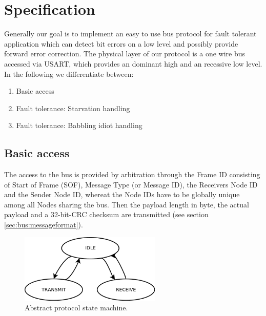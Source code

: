 \section{Specification}
\label{sec:bus:specification}
Generally our goal is to implement an easy to use bus protocol for fault tolerant application which can 
detect bit errors on a low level and possibly provide forward error correction.
The physical layer of our protocol is a one wire bus accessed via USART, which provides an dominant 
high and an recessive low level.
In the following we differentiate between: 
\begin{enumerate}
 \item Basic access
 \item Fault tolerance: Starvation handling
 \item Fault tolerance: Babbling idiot handling
\end{enumerate}

\subsection{Basic access}
\label{sec:bus:basicaccess}
The access to the bus is provided by arbitration through the Frame ID consisting of Start of Frame (SOF), 
Message Type (or Message ID), the Receivers Node ID and the Sender Node ID, whereat the Node IDs have to 
be globally unique among all Nodes sharing the bus.
Then the payload length in byte, the actual payload and a 32-bit-CRC checksum are transmitted (see section \ref{sec:bus:messageformat}).\\

\begin{figure}[h]
\centering
\includegraphics[width=0.6\textwidth]{../images/abstract_statemachine.png}
\caption{Abstract protocol state machine.}
\label{fig:bus:basicaccess:abstractstatemachine}
\end{figure}

